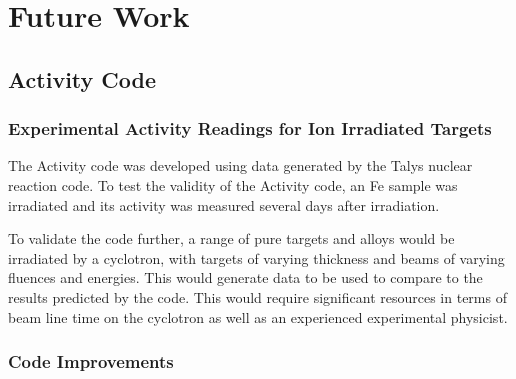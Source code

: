 \chapter{Future Work}
\label{chapter:futurework}

\begin{changemargin}{1.0cm}{1.0cm} 
\end{changemargin}


\section{Activity Code}

\subsection{Experimental Activity Readings for Ion Irradiated Targets}

The Activity code was developed using data generated by the Talys nuclear reaction code.  To test the validity of the Activity code, an \Gls{Fe} sample was irradiated and its activity was measured several days after irradiation.

To validate the code further, a range of pure targets and alloys would be irradiated by a cyclotron, with targets of varying thickness and beams of varying fluences and energies.  This would generate data to be used to compare to the results predicted by the code.  This would require significant resources in terms of beam line time on the cyclotron as well as an experienced experimental physicist.


\subsection{Code Improvements}

